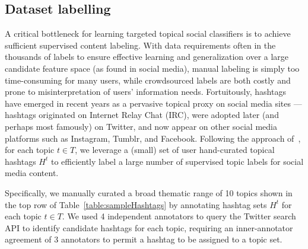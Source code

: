 %

%
%


\subsection*{Dataset labelling}

A critical bottleneck for learning targeted topical social classifiers 
is to achieve sufficient supervised content labeling.  With data
requirements often in the thousands of labels to ensure effective
learning and generalization over a large candidate feature space (as
found in social media), manual labeling is simply too time-consuming
for many users, while crowdsourced labels are both costly and prone to
misinterpretation of users' information needs.  Fortuitously, hashtags
have emerged in recent years as a pervasive topical proxy on social
media sites --- hashtags originated on Internet Relay Chat (IRC), were adopted later
(and perhaps most famously) on Twitter, and now appear on other social
media platforms such as Instagram, Tumblr, and Facebook.  Following
the approach of~\cite{lin2011smoothing}, for each topic $t \in T$, we leverage a (small) set of
user hand-curated topical hashtags $H^t$ to efficiently label a large number of
supervised topic labels for social media content.  

Specifically, we manually curated a broad thematic range of 10 topics shown in the top row of
Table~\ref{table:sampleHashtags} by annotating hashtag sets $H^t$ for each topic $t \in T$.  We used 4
independent annotators to query the Twitter search API to identify
candidate hashtags for each topic, requiring an inner-annotator
agreement of 3 annotators to permit a hashtag to be assigned to a
topic set. 





